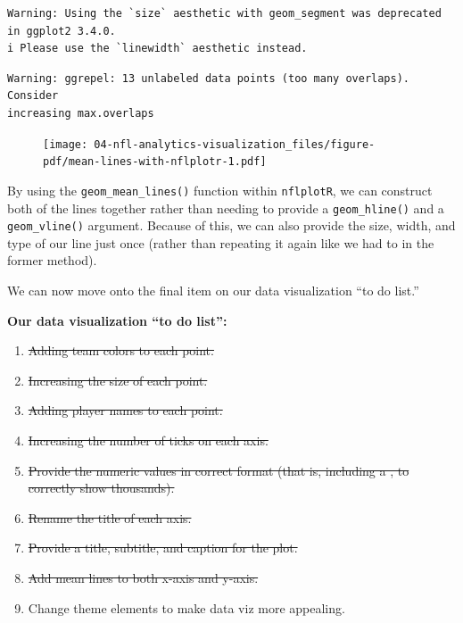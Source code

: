 \documentclass[
  letterpaper,
]{krantz}
\begin{document}
\begin{verbatim}
Warning: Using the `size` aesthetic with geom_segment was deprecated in ggplot2 3.4.0.
i Please use the `linewidth` aesthetic instead.
\end{verbatim}

\begin{verbatim}
Warning: ggrepel: 13 unlabeled data points (too many overlaps). Consider
increasing max.overlaps
\end{verbatim}

\begin{figure}[H]

{\centering \texttt{[image: 04-nfl-analytics-visualization\_files/figure-pdf/mean-lines-with-nflplotr-1.pdf]}

}

\end{figure}

By using the \texttt{geom\_mean\_lines()} function within
\texttt{nflplotR}, we can construct both of the lines together rather
than needing to provide a \texttt{geom\_hline()} and a
\texttt{geom\_vline()} argument. Because of this, we can also provide
the size, width, and type of our line just once (rather than repeating
it again like we had to in the former method).

We can now move onto the final item on our data visualization ``to do
list.''

\begin{tcolorbox}[enhanced jigsaw, colback=white, leftrule=.75mm, breakable, colframe=quarto-callout-note-color-frame, bottomtitle=1mm, rightrule=.15mm, left=2mm, opacityback=0, bottomrule=.15mm, arc=.35mm, coltitle=black, colbacktitle=quarto-callout-note-color!10!white, toptitle=1mm, titlerule=0mm, title=\textcolor{quarto-callout-note-color}{\faInfo}\hspace{0.5em}{Note}, toprule=.15mm, opacitybacktitle=0.6]

\textbf{Our data visualization ``to do list'':}

\begin{enumerate}
\def\labelenumi{\arabic{enumi}.}
\item
  \st{Adding team colors to each point.}
\item
  \st{Increasing the size of each point.}
\item
  \st{Adding player names to each point.}
\item
  \st{Increasing the number of ticks on each axis.}
\item
  \st{Provide the numeric values in correct format (that is, including a
  , to correctly show thousands).}
\item
  \st{Rename the title of each axis.}
\item
  \st{Provide a title, subtitle, and caption for the plot.}
\item
  \st{Add mean lines to both x-axis and y-axis.}
\item
  Change theme elements to make data viz more appealing.
\end{enumerate}

\end{tcolorbox}
\end{document}
